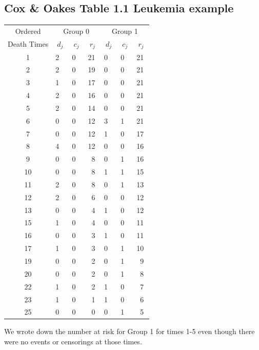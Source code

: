 \documentclass[11pt,slidesonly,semrot,portrait,palatino]{book}
\begin{document}
{\subsection{Cox \& Oakes Table 1.1 Leukemia example}
\begin{center}
\begin{tabular}{clll|lll}
Ordered     & \multicolumn{3}{c}{Group 0} &  \multicolumn{3}{c}{Group 1}  \\ \cline{2-7}
Death Times & $~d_j~$ & $~c_j~$ & $~r_j~$  &  $~d_j~$ & $~c_j~$ & $~r_j~$ \\\hline
  1         &  2      &   0     &  21      &    0    &    0    &   21 \\
  2         &  2      &   0     &  19      &    0    &    0    &   21 \\
  3         &  1      &   0     &  17      &    0    &    0    &   21 \\
  4         &  2      &   0     &  16      &    0    &    0    &   21 \\
  5         &  2      &   0     &  14      &    0    &    0    &   21 \\
  6         &  0      &   0     &  12      &    3    &    1    &   21 \\
  7         &  0      &   0     &  12      &    1    &    0    &   17 \\
  8         &  4      &   0     &  12      &    0    &    0    &   16 \\
  9         &  0      &   0     &  ~8      &    0    &    1    &   16 \\
 10         &  0      &   0     &  ~8      &    1    &    1    &   15 \\
 11         &  2      &   0     &  ~8      &    0    &    1    &   13 \\
 12         &  2      &   0     &  ~6      &    0    &    0    &   12 \\
 13         &  0      &   0     &  ~4      &    1    &    0    &   12 \\
 15         &  1      &   0     &  ~4      &    0    &    0    &   11 \\
 16         &  0      &   0     &  ~3      &    1    &    0    &   11 \\
 17         &  1      &   0     &  ~3      &    0    &    1    &   10 \\
 19         &  0      &   0     &  ~2      &    0    &    1    &   ~9 \\
 20         &  0      &   0     &  ~2      &    0    &    1    &   ~8 \\
 22         &  1      &   0     &  ~2      &    1    &    0    &   ~7 \\
 23         &  1      &   0     &  ~1      &    1    &    0    &   ~6 \\
 25         &  0      &   0     &  ~0      &    0    &    1    &   ~5 \\ \hline
\end{tabular}
\end{center}
We wrote down the number at risk for Group 1 for times
1-5 even though there were no events or censorings at those times.
\normalsize
}
\end{document}
